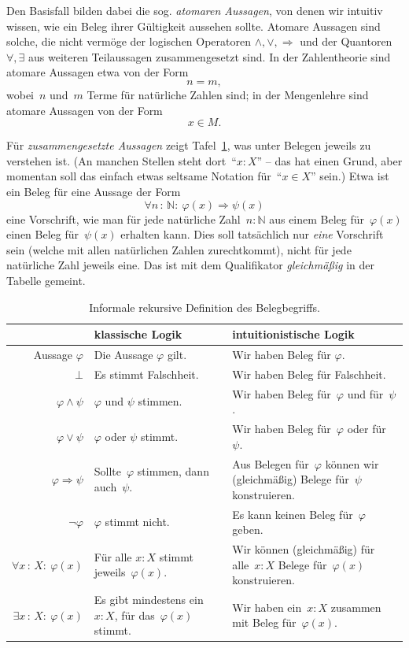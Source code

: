 \documentclass[a4paper,ngerman,12pt]{scrartcl}
\theoremstyle{definition}
\theoremstyle{plain}
\theoremstyle{remark}
\newcommand{\NN}{\mathbb{N}}
\renewcommand{\_}{\mathpunct{.}\,}
\newcommand{\?}{\,{:}\,}
\begin{document}
Den Basisfall bilden dabei die sog. \emph{atomaren Aussagen}, von denen wir
intuitiv wissen, wie ein Beleg ihrer Gültigkeit aussehen sollte. Atomare Aussagen sind
solche, die nicht vermöge der logischen Operatoren $\wedge, \vee,
\Rightarrow$ und der Quantoren~$\forall, \exists$ aus weiteren Teilaussagen
zusammengesetzt sind. In der Zahlentheorie sind atomare Aussagen etwa von der
Form
\[ n = m, \]
wobei~$n$ und~$m$ Terme für natürliche Zahlen sind; in der Mengenlehre sind
atomare Aussagen von der Form
\[ x \in M. \]

Für \emph{zusammengesetzte Aussagen} zeigt Tafel~\ref{bhk}, was unter Belegen
jeweils zu verstehen ist. (An manchen Stellen steht dort~"`$x : X$"' -- das hat
einen Grund, aber momentan soll das einfach etwas seltsame Notation für~"`$x
\in X$"' sein.) Etwa ist ein Beleg für eine Aussage der Form
\[ \forall n \? \NN{:}\ \varphi(x) \Rightarrow \psi(x) \]
eine Vorschrift, wie man für jede natürliche Zahl~$n : \NN$ aus einem Beleg
für~$\varphi(x)$ einen Beleg für~$\psi(x)$ erhalten kann. Dies soll tatsächlich nur
\emph{eine} Vorschrift sein (welche mit allen natürlichen Zahlen zurechtkommt),
nicht für jede natürliche Zahl jeweils eine. Das ist mit dem Qualifikator \emph{gleichmäßig} in
der Tabelle gemeint.

\begin{table}
  \centering
  \small
  \renewcommand{\arraystretch}{1.3}
  \begin{tabular}{@{}rp{5.9cm}p{6.5cm}@{}}
    \toprule
    & {klassische Logik} & {intuitionistische Logik}
    \\\midrule
    Aussage $\varphi$ & Die Aussage $\varphi$ gilt. & Wir haben Beleg für $\varphi$. \\
    $\bot$ & Es stimmt Falschheit. & Wir haben Beleg für Falschheit. \\
    $\varphi \wedge \psi$ & $\varphi$ und $\psi$ stimmen. & Wir haben Beleg für~$\varphi$ und für~$\psi$. \\
    $\varphi \vee \psi$ & $\varphi$ oder $\psi$ stimmt. & Wir haben Beleg für~$\varphi$ oder für~$\psi$. \\
    $\varphi \Rightarrow \psi$ & Sollte~$\varphi$ stimmen, dann auch~$\psi$. &
    Aus Belegen für~$\varphi$ können wir (gleich\-mä\-ßig) Belege für~$\psi$ konstruieren. \\
    $\neg\varphi$ &
      $\varphi$ stimmt nicht. &
      Es kann keinen Beleg für~$\varphi$ geben. \\
    $\forall x\?X{:}\ \varphi(x)$ & Für alle $x : X$ stimmt jeweils~$\varphi(x).$ &
      Wir können (gleichmäßig) für alle~$x : X$ Belege für~$\varphi(x)$ konstruieren. \\
    $\exists x\?X{:}\ \varphi(x)$ & \raggedright Es gibt mindestens ein~$x : X$, für das~$\varphi(x)$
    stimmt. & {\raggedright
      Wir haben ein~$x : X$ zusammen mit Beleg für~$\varphi(x).$} \\
    \bottomrule
  \end{tabular}
  \caption{\label{bhk}Informale rekursive Definition des Belegbegriffs.}
\end{table}
\end{document}

